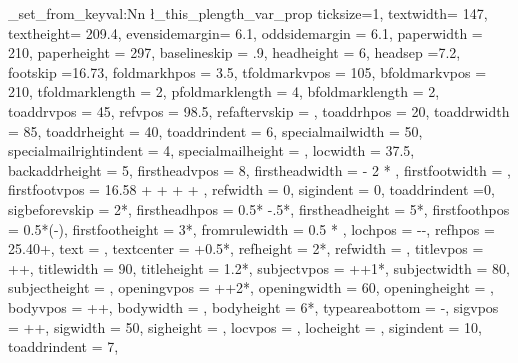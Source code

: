 \prop_set_from_keyval:Nn \l_this_plength_var_prop {
  ticksize=1,
  textwidth= 147,
  textheight= 209.4,
  evensidemargin= 6.1,
  oddsidemargin = 6.1,
  paperwidth = 210,
  paperheight = 297,
  baselineskip = .9\baselineskip,%
  headheight     =  6,
  headsep        =7.2,
  footskip       =16.73,
  foldmarkhpos = 3.5,
  tfoldmarkvpos = 105,
  bfoldmarkvpos = 210,
  tfoldmarklength = 2,
  pfoldmarklength = 4,
  bfoldmarklength = 2,
  toaddrvpos = 45,
  refvpos = 98.5,
  refaftervskip = ,
  toaddrhpos = 20,
  toaddrwidth = 85,
  toaddrheight = 40,
  toaddrindent = 6,
  specialmailwidth = 50,
  specialmailrightindent = 4,
  specialmailheight = ,
  locwidth = 37.5,
  backaddrheight = 5,
  firstheadvpos = 8,
  firstheadwidth =  - 2 * ,
  firstfootwidth = ,
  firstfootvpos =  16.58 +  +  +  + ,
  refwidth = 0,
  sigindent = 0,
  toaddrindent =0,
  sigbeforevskip = 2*,
  firstheadhpos = 0.5* -.5*,
  firstheadheight = 5*,
  firstfoothpos = 0.5*(-),
  firstfootheight = 3*,
  fromrulewidth = 0.5 * ,
  lochpos = --,
  refhpos = 25.40+,
  text = ,
  textcenter = +0.5*,
  refheight = 2*,
  refwidth = ,
  titlevpos = ++,
  titlewidth = 90,
  titleheight = 1.2*,
  subjectvpos = ++1*,
  subjectwidth = 80,
  subjectheight = ,
  openingvpos = ++2*,
  openingwidth = 60,
  openingheight = ,
  bodyvpos = ++,
  bodywidth = ,
  bodyheight = 6*,
  typeareabottom = -,
  sigvpos = ++,
  sigwidth = 50,
  sigheight = ,
  locvpos = ,
  locheight = ,
  sigindent = 10,
  toaddrindent = 7,
}
\def\UseVar#1{
  \fp_eval:n {\prop_item:Nn \l_this_plength_var_prop {#1}}
}

